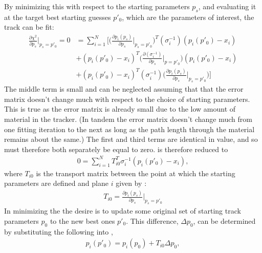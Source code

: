 By minimizing this \chisq with respect to the starting parameters $p_{s}$, and evaluating it at the target best starting guesses $p'_{0}$, which are the parameters of interest, the track can be fit:
    \begin{equation}
    \begin{aligned}
        \frac{\partial \chi^{2}}{\partial p_{s}}\Big|_{p_{s}=p'_{0}} = 0 
            &= \sum_{i=1}^{N}\Big[ \Big(\frac{\partial p_{i}(p_{s})}{\partial p_{s}}\Big|_{p_{s}=p'_{0}}\Big)^{T} (\sigma_{i}^{-1}) (p_{i}(p'_{0})-x_{i}) \\ 
            &+ (p_{i}(p'_{0})-x_{i})^{T} \Big(\frac{\partial(\sigma_{i}^{-1})}{\partial p_{s}}\Big|_{p=p'_{0}}\Big) (p_{i}(p'_{0})-x_{i}) \\ 
            &+  (p_{i}(p'_{0})-x_{i})^{T} (\sigma_{i}^{-1}) \Big(\frac{\partial p_{i}(p_{s})}{\partial p_{s}}\Big|_{p_{s}=p'_{0}}\Big)\Big]
    \label{eq:chi2summinimize}
    \end{aligned}
    \end{equation}
The middle term is small and can be neglected assuming that that the error matrix doesn't change much with respect to the choice of starting parameters. This is true as the error matrix is already small due to the low amount of material in the tracker. (In tandem the error matrix doesn't change much from one fitting iteration to the next as long as the path length through the material remains about the same.) The first and third terms are identical in value, and so must therefore both separately be equal to zero.  is therefore reduced to 
    \begin{align} \label{eq:chi2sumreduced}
        0 = \sum_{i=1}^{N} T^{T}_{i0} \sigma_{i}^{-1} (p_{i}(p'_{0})-x_{i}),
    \end{align}
where $T_{i0}$ is the transport matrix between the point at which the starting parameters are defined and plane $i$ given by :
    \begin{align} \label{eq:transportfrom0}
         T_{i0} = \frac{\partial p_{i}(p_{s})}{\partial p_{s}}\Big|_{p_{s}=p'_{0}}
    \end{align}
In minimizing the \chisq the desire is to update some original set of starting track parameters $p_{0}$ to the new best ones $p'_{0}$. This difference, $\Delta p_{0}$, can be determined by substituting the following into ,
    \begin{align} \label{eq:psub}
        p_{i}(p'_{0}) = p_{i}(p_{0}) + T_{i0} \Delta p_{0},
    \end{align}
